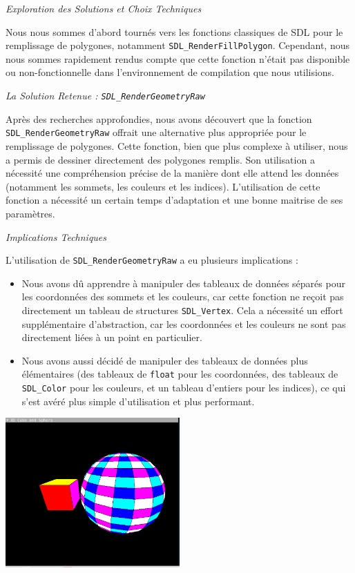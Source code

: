 \documentclass[12pt]{article}
\begin{document}
\textit{Exploration des Solutions et Choix Techniques}

\noindent Nous nous sommes d'abord tournés vers les fonctions classiques de SDL pour le remplissage de polygones, notamment \texttt{SDL\_RenderFillPolygon}. Cependant, nous nous sommes rapidement rendus compte que cette fonction n'était pas disponible ou non-fonctionnelle dans l'environnement de compilation que nous utilisions.

\textit{La Solution Retenue : \texttt{SDL\_RenderGeometryRaw}}

\noindent Après des recherches approfondies, nous avons découvert que la fonction \texttt{SDL\_RenderGeometryRaw} offrait une alternative plus appropriée pour le remplissage de polygones. Cette fonction, bien que plus complexe à utiliser, nous a permis de dessiner directement des polygones remplis. Son utilisation a nécessité une compréhension précise de la manière dont elle attend les données (notamment les sommets, les couleurs et les indices). L'utilisation de cette fonction a nécessité un certain temps d'adaptation et une bonne maitrise de ses paramètres.


\textit{Implications Techniques}

\noindent L'utilisation de \texttt{SDL\_RenderGeometryRaw} a eu plusieurs implications :
\begin{itemize}
\item Nous avons dû apprendre à manipuler des tableaux de données séparés pour les coordonnées des sommets et les couleurs, car cette fonction ne reçoit pas directement un tableau de structures \texttt{SDL\_Vertex}. Cela a nécessité un effort supplémentaire d'abstraction, car les coordonnées et les couleurs ne sont pas directement liées à un point en particulier.
   \item Nous avons aussi décidé de manipuler des tableaux de données plus élémentaires (des tableaux de \texttt{float} pour les coordonnées, des tableaux de \texttt{SDL\_Color} pour les couleurs, et un tableau d'entiers pour les indices), ce qui s'est avéré plus simple d'utilisation et plus performant.
\end{itemize}

\begin{center}
\includegraphics[width=0.5\textwidth]{3.png}
\end{center}
\end{document}

